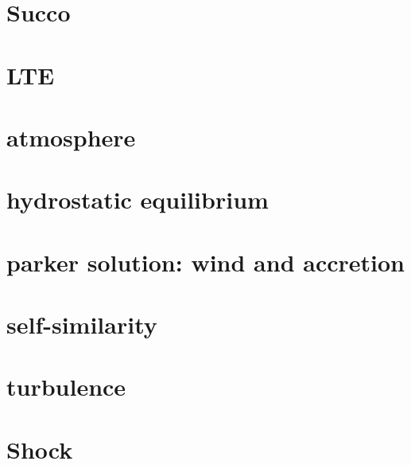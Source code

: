 \section{Succo}

\section{LTE}

\section{atmosphere}

\section{hydrostatic equilibrium}

\section{parker solution: wind and accretion}

\section{self-similarity}

\section{turbulence}

\section{Shock}